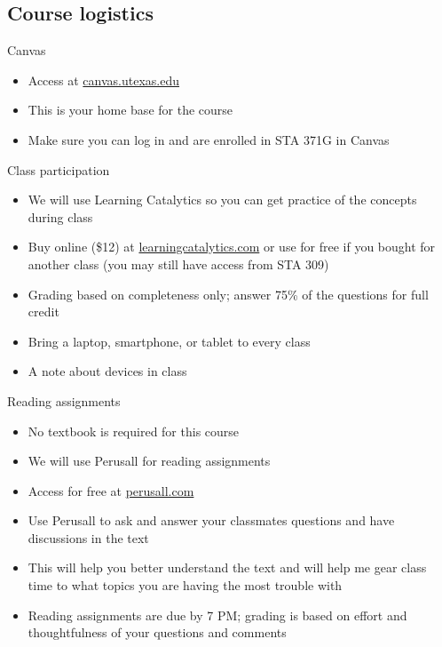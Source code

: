 \documentclass{beamer}\usepackage[]{graphicx}\usepackage[]{color}
\begin{document}
\begin{darkframes}
    \section{Course logistics}

    \begin{frame}{Canvas}
      \begin{itemize}
        \item Access at \url{canvas.utexas.edu}
        \item This is your home base for the course
        \item Make sure you can log in and are enrolled in STA 371G in Canvas
      \end{itemize}
    \end{frame}

    \begin{frame}{Class participation}
      \begin{itemize}
        \item We will use \alert{Learning Catalytics} so you can get practice of the concepts during class
        \item Buy online (\$12) at \url{learningcatalytics.com} or use for free if you bought for another class (you may still have access from STA 309)
        \item Grading based on completeness only; answer 75\% of the questions for full credit
        \item Bring a laptop, smartphone, or tablet to every class
        \item A note about devices in class
      \end{itemize}
    \end{frame}

    \begin{frame}{Reading assignments}
      \begin{itemize}
        \item No textbook is required for this course
        \item We will use \alert{Perusall} for reading assignments
        \item Access for free at \url{perusall.com}
        \item Use Perusall to ask and answer your classmates questions and have discussions in the text
        \item This will help you better understand the text and will help me gear class time to what topics you are having the most trouble with
        \item Reading assignments are due by 7 PM; grading is based on effort and thoughtfulness of your questions and comments
      \end{itemize}
    \end{frame}


\end{darkframes}
\end{document}
